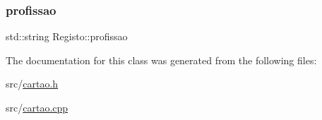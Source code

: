 \subsubsection{\texorpdfstring{profissao}{profissao}}
{\footnotesize\ttfamily std\+::string Registo\+::profissao\hspace{0.3cm}{\ttfamily [private]}}



The documentation for this class was generated from the following files\+:\begin{DoxyCompactItemize}
\item 
src/\mbox{\hyperlink{cartao_8h}{cartao.\+h}}\item 
src/\mbox{\hyperlink{cartao_8cpp}{cartao.\+cpp}}\end{DoxyCompactItemize}
